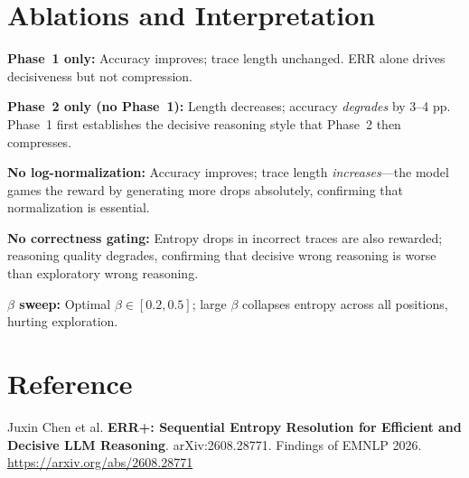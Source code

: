 \documentclass[10pt,twocolumn]{article}
\begin{document}
\section{Ablations and Interpretation}

\textbf{Phase~1 only:} Accuracy improves; trace length unchanged.
ERR alone drives decisiveness but not compression.

\textbf{Phase~2 only (no Phase~1):} Length decreases; accuracy
\emph{degrades} by 3--4 pp. Phase~1 first establishes the decisive
reasoning style that Phase~2 then compresses.

\textbf{No log-normalization:} Accuracy improves; trace length
\emph{increases}---the model games the reward by generating more drops
absolutely, confirming that normalization is essential.

\textbf{No correctness gating:} Entropy drops in incorrect traces are
also rewarded; reasoning quality degrades, confirming that decisive wrong
reasoning is worse than exploratory wrong reasoning.

\textbf{$\beta$ sweep:} Optimal $\beta\in[0.2, 0.5]$; large $\beta$
collapses entropy across all positions, hurting exploration.

\section*{Reference}

Juxin Chen et al.
\textbf{ERR{+}: Sequential Entropy Resolution for Efficient and
Decisive LLM Reasoning}.
arXiv:2608.28771. Findings of EMNLP 2026.\\
\url{https://arxiv.org/abs/2608.28771}
\end{document}
